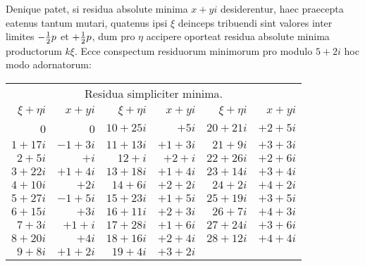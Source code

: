 \documentclass[twoside,12pt, showframe]{memoir}
\let\oldfrac\frac
\def\frac#1#2{\mathchoice{\tfrac{#1}{#2}}{\oldfrac{#1}{#2}}{\genfrac{}{}{}{2}{#1}{#2\mathstrut}}{\genfrac{}{}{}{3}{#1}{#2\mathstrut}}}
\begin{document}
Denique patet, si residua absolute minima \(x+y i\) desiderentur, haec praecepta eatenus tantum mutari, quatenus ipsi \(\xi\) deinceps tribuendi sint valores inter limites \(-\frac{1}{2} p\) et \(+\frac{1}{2} p\), dum pro \(\eta\) accipere oporteat residua absolute minima productorum \(k \xi\). Ecce conspectum residuorum minimorum pro modulo \(5+2 i\) hoc modo adornatorum:
\begin{center}
\begin{tabular}{r|r||r|r||r|r}
\multicolumn{6}{c}{Residua simpliciter minima.}\\
\(\xi+\eta i\) & \(x+y i\) & \(\xi+\eta i\) & \(x+y i\) & \(\xi+\eta i\) & \(x+y i\) \\
\hline
0 & 0 & \(10+25 i\) & \(+5 i\) & \(20+21 i\) & \(+2+5 i\) \\
\(1+17 i\) & \(-1+3 i\) & \(11+13 i\) & \(+1+3 i\) & \(21+9 i\) & \(+3+3 i\) \\
\(2+5 i\) & \(+i\) & \(12+i\) & \(+2+i\) & \(22+26 i\) & \(+2+6 i\) \\
\(3+22 i\) & \(+1+4 i\) & \(13+18 i\) & \(+1+4 i\) & \(23+14 i\) & \(+3+4 i\) \\
\(4+10 i\) & \(+2 i\) & \(14+6 i\) & \(+2+2 i\) & \(24+2 i\) & \(+4+2 i\) \\
\(5+27 i\) & \(-1+5 i\) & \(15+23 i\) & \(+1+5 i\) & \(25+19 i\) & \(+3+5 i\) \\
\(6+15 i\) & \(+3 i\) & \(16+11 i\) & \(+2+3 i\) & \(26+7 i\) & \(+4+3 i\) \\
\(7+3 i\) & \(+1+i\) & \(17+28 i\) & \(+1+6 i\) & \(27+24 i\) & \(+3+6 i\) \\
\(8+20 i\) & \(+4 i\) & \(18+16 i\) & \(+2+4 i\) & \(28+12 i\) & \(+4+4 i\) \\
\(9+8 i\) & \(+1+2 i\) & \(19+4 i\) & \(+3+2 i\) &\multicolumn{2}{c}{}  \\
\end{tabular}
\end{center}\clearpage\noindent%
\end{document}
